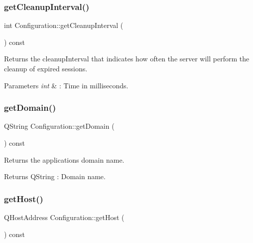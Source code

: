 \subsubsection{\texorpdfstring{get\+Cleanup\+Interval()}{getCleanupInterval()}}
{\footnotesize\ttfamily int Configuration\+::get\+Cleanup\+Interval (\begin{DoxyParamCaption}{ }\end{DoxyParamCaption}) const}



Returns the cleanup\+Interval that indicates how often the server will perform the cleanup of expired sessions. 


\begin{DoxyParams}{Parameters}
{\em int} & \+: Time in milliseconds. \\
\hline
\end{DoxyParams}
\mbox{\label{class_configuration_ab58d8dc13a90745af4925e9b238c8cff}} 
\subsubsection{\texorpdfstring{get\+Domain()}{getDomain()}}
{\footnotesize\ttfamily Q\+String Configuration\+::get\+Domain (\begin{DoxyParamCaption}{ }\end{DoxyParamCaption}) const}



Returns the applications domain name. 

\begin{DoxyReturn}{Returns}
Q\+String \+: Domain name. 
\end{DoxyReturn}
\mbox{\label{class_configuration_a37ca7476a8ab5a1e6c4b5a3e07670d9f}} 
\subsubsection{\texorpdfstring{get\+Host()}{getHost()}}
{\footnotesize\ttfamily Q\+Host\+Address Configuration\+::get\+Host (\begin{DoxyParamCaption}{ }\end{DoxyParamCaption}) const}



